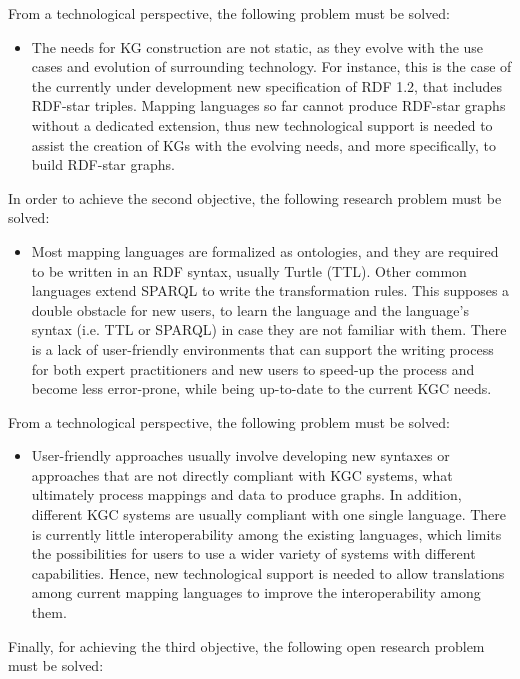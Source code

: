 From a technological perspective, the following problem must be solved:
\begin{itemize}
    \item The needs for KG construction are not static, as they evolve with the use cases and evolution of surrounding technology. For instance, this is the case of the currently under development new specification of RDF 1.2, that includes RDF-star triples. Mapping languages so far cannot produce RDF-star graphs without a dedicated extension, thus new technological support is needed to assist the creation of KGs with the evolving needs, and more specifically, to build RDF-star graphs. 
\end{itemize}

In order to achieve the second objective, the following research problem must be solved:
\begin{itemize}
    \item Most mapping languages are formalized as ontologies, and they are required to be written in an RDF syntax, usually Turtle (TTL). Other common languages extend SPARQL to write the transformation rules. This supposes a double obstacle for new users, to learn the language and the language's syntax (i.e. TTL or SPARQL) in case they are not familiar with them. There is a lack of user-friendly environments that can support the writing process for both expert practitioners and new users to speed-up the process and become less error-prone, while being up-to-date to the current KGC needs. 
\end{itemize}

From a technological perspective, the following problem must be solved:
\begin{itemize}

    \item User-friendly approaches usually involve developing new syntaxes or approaches that are not directly compliant with KGC systems, what ultimately process mappings and data to produce graphs. In addition, different KGC systems are usually compliant with one single language. There is currently little interoperability among the existing languages, which limits the possibilities for users to use a wider variety of systems with different capabilities. Hence, new technological support is needed to allow translations among current mapping languages to improve the interoperability among them. 

\end{itemize}

Finally, for achieving the third objective, the following open research problem must be solved:

